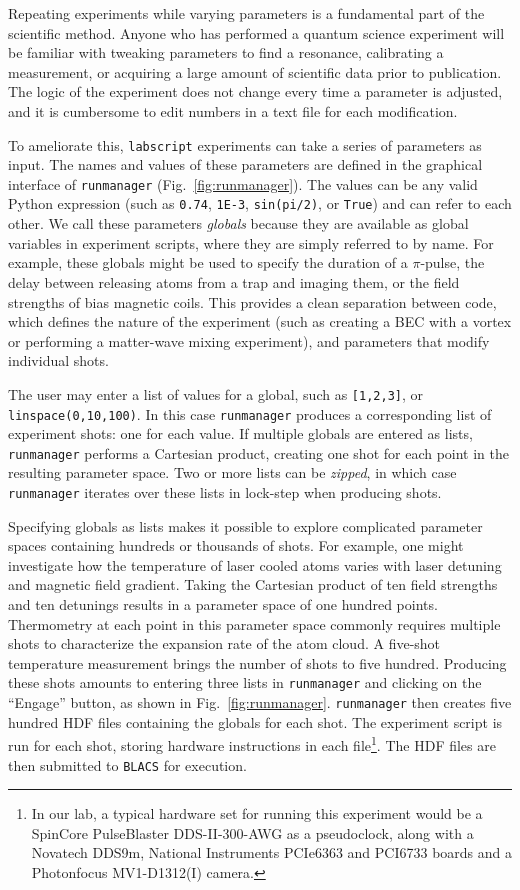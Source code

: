 Repeating experiments while varying parameters is a fundamental part of the scientific method.
Anyone who has performed a quantum science experiment will be familiar with tweaking parameters to find a resonance, calibrating a measurement, or acquiring a large amount of scientific data prior to publication.
The logic of the experiment does not change every time a parameter is adjusted, and it is cumbersome to edit numbers in a text file for each modification.

To ameliorate this, \texttt{labscript} experiments can take a series of parameters as input.
The names and values of these parameters are defined in the graphical interface of \texttt{runmanager} (Fig.~\ref{fig:runmanager}).
The values can be any valid Python expression (such as \texttt{0.74}, \texttt{1E-3}, \texttt{sin(pi/2)}, or \texttt{True}) and can refer to each other.
We call these parameters \textit{globals} because they are available as global variables in experiment scripts, where they are simply referred to by name.
For example, these globals might be used to specify the duration of a $\pi$-pulse, the delay between releasing atoms from a trap and imaging them, or the field strengths of bias magnetic coils.
This provides a clean separation between code, which defines the nature of the experiment (such as creating a BEC with a vortex or performing a matter-wave mixing experiment), and parameters that modify individual shots.

The user may enter a list of values for a global, such as \texttt{[1,2,3]}, or \texttt{linspace(0,10,100)}.
In this case \texttt{runmanager} produces a corresponding list of experiment shots: one for each value.
If multiple globals are entered as lists, \texttt{runmanager} performs a Cartesian product, creating one shot for each point in the resulting parameter space.
Two or more lists can be \textit{zipped}, in which case \texttt{runmanager} iterates over these lists in lock-step when producing shots.

Specifying globals as lists makes it possible to explore complicated parameter spaces containing hundreds or thousands of shots.
For example, one might investigate how the temperature of laser cooled atoms varies with laser detuning and magnetic field gradient.
Taking the Cartesian product of ten field strengths and ten detunings results in a parameter space of one hundred points.
Thermometry at each point in this parameter space commonly requires multiple shots to characterize the expansion rate of the atom cloud.
A five-shot temperature measurement brings the number of shots to five hundred.
Producing these shots amounts to entering three lists in \texttt{runmanager} and clicking on the ``Engage'' button, as shown in Fig.~\ref{fig:runmanager}.
\texttt{runmanager} then creates five hundred HDF files containing the globals for each shot.
The experiment script is run for each shot, storing hardware instructions in each file\footnote{In our lab, a typical hardware set for running this experiment would be a SpinCore PulseBlaster DDS-II-300-AWG as a pseudoclock, along with a Novatech DDS9m, National Instruments PCIe6363 and PCI6733 boards and a Photonfocus MV1-D1312(I) camera.}.
The HDF files are then submitted to \texttt{BLACS} for execution.

